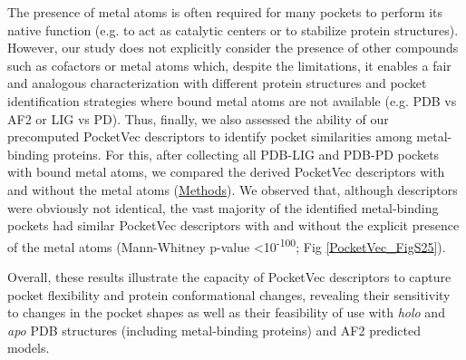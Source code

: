 The presence of metal atoms is often required for many pockets to perform its native function (e.g. to act as catalytic centers or to stabilize protein structures). However, our study does not explicitly consider the presence of other compounds such as cofactors or metal atoms which, despite the limitations, it enables a fair and analogous characterization with different protein structures and pocket identification strategies where bound metal atoms are not available (e.g. PDB vs AF2 or LIG vs PD). Thus, finally, we also assessed the ability of our precomputed PocketVec descriptors to identify pocket similarities among metal-binding proteins. For this, after collecting all PDB-LIG and PDB-PD pockets with bound metal atoms, we compared the derived PocketVec descriptors with and without the metal atoms (\hyperref[PocketVec_Methods]{Methods}). We observed that, although descriptors were obviously not identical, the vast majority of the identified metal-binding pockets had similar PocketVec descriptors with and without the explicit presence of the metal atoms (Mann-Whitney p-value <10\textsuperscript{-100}; Fig \ref{PocketVec_FigS25}). 

Overall, these results illustrate the capacity of PocketVec descriptors to capture pocket flexibility and protein conformational changes, revealing their sensitivity to changes in the pocket shapes as well as their feasibility of use with \textit{holo} and \textit{apo} PDB structures (including metal-binding proteins) and AF2 predicted models. 




